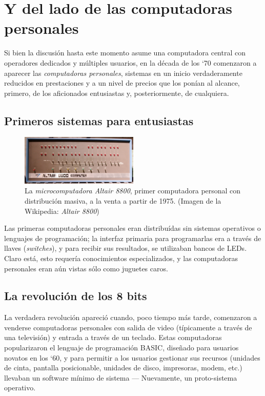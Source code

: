 \documentclass[11pt,fleqn]{book} %
\begin{document}
\section{Y del lado de las computadoras personales}
\label{sec-1-4}
\label{INTRO_computadoras_personales}


Si bien la discusión hasta este momento asume una computadora central
con operadores dedicados y múltiples usuarios, en la década de los
`70 comenzaron a aparecer las \emph{computadoras personales}, sistemas en
un inicio verdaderamente reducidos en prestaciones y a un nivel de
precios que los ponían al alcance, primero, de los aficionados
entusiastas y, posteriormente, de cualquiera.
\subsection{Primeros sistemas para entusiastas}
\label{sec-1-4-1}


\begin{figure}[htb]
\centering
\includegraphics[width=0.5\textwidth]{./img/altair.jpg}
\caption{\label{INTRO_altair}La \emph{microcomputadora Altair 8800}, primer computadora personal con distribución masiva, a la venta a partir de 1975. (Imagen de la Wikipedia: \emph{Altair 8800})}
\end{figure}

Las primeras computadoras personales eran distribuídas sin 
sistemas operativos o lenguajes de programación; la interfaz primaria
para programarlas era a través de llaves (\emph{switches}), y para recibir sus
resultados, se utilizaban bancos de LEDs. Claro está, esto requería conocimientos
especializados, y las computadoras personales eran aún vistas sólo
como juguetes caros.
\subsection{La revolución de los 8 bits}
\label{sec-1-4-2}


La verdadera revolución apareció cuando‚ poco tiempo más tarde,
comenzaron a venderse computadoras personales con salida de video
(típicamente a través de una televisión) y entrada a través de un
teclado. Estas computadoras popularizaron el lenguaje de programación
BASIC, diseñado para usuarios novatos en los `60, y para permitir a
los usuarios gestionar sus recursos (unidades de cinta, pantalla
posicionable, unidades de disco, impresoras, modem, etc.) llevaban un
software mínimo de sistema — Nuevamente, un proto-sistema operativo.
\end{document}
